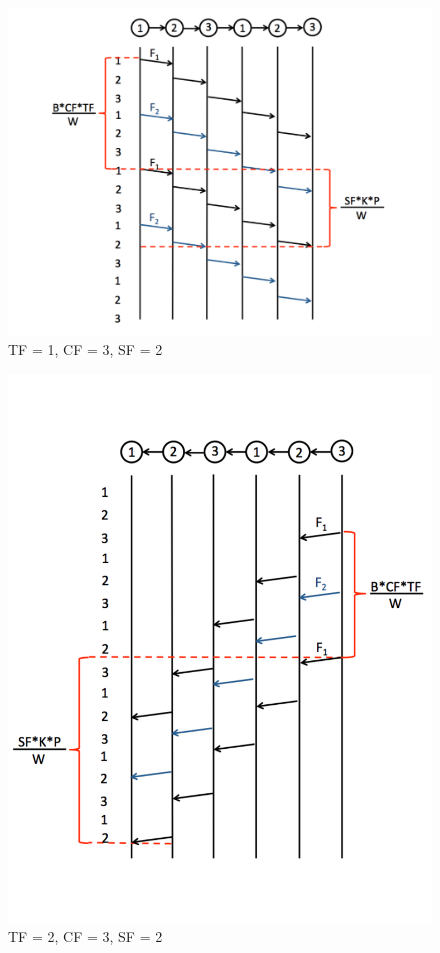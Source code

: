 \documentclass[conference]{IEEEtran}
\begin{document}
\begin{figure}
    \includegraphics[scale=0.35]{figures/delay_limit_expl/delay_expl_fig_3.pdf}
    \caption{TF = 1, CF = 3, SF = 2}
    \label{fig:delay_expl_fig_3}
\end{figure}
  
\begin{figure}
    \includegraphics[scale=0.35]{figures/delay_limit_expl/delay_expl_fig_4.pdf}
    \caption{TF = 2, CF = 3, SF = 2}
    \label{fig:delay_expl_fig_4}
\end{figure}
\end{document}
